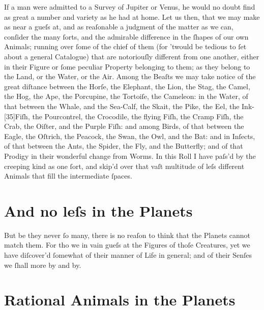 \documentclass[letterpaper]{book}
\begin{document}
If a man were admitted to a Survey of Jupiter or Venus, he would no doubt
find as great a number and variety as he had at home. Let us then, that we
may make as near a gueſs at, and as reaſonable a judgment of the matter
as we can, conſider the many ſorts, and the admirable difference in the
ſhapes of our own Animals; running over ſome of the chief of them (for
'twould be tedious to ſet about a general Catalogue) that are notoriouſly
different from one another, either in their Figure or ſome peculiar Property
belonging to them; as they belong to the Land, or the Water, or the Air.
Among the Beaſts we may take notice of the great diſtance between the
Horſe, the Elephant, the Lion, the Stag, the Camel, the Hog, the Ape, the
Porcupine, the Tortoiſe, the Cameleon: in the Water, of that between the
Whale, and the Sea-Calf, the Skait, the Pike, the Eel, the Ink-[35]Fiſh, the
Pourcontrel, the Crocodile, the flying Fiſh, the Cramp Fiſh, the Crab, the
Oiſter, and the Purple Fiſh: and among Birds, of that between the Eagle,
the Oſtrich, the Peacock, the Swan, the Owl, and the Bat: and in Inſects,
of that between the Ants, the Spider, the Fly, and the Butterfly; and of that
Prodigy in their wonderful change from Worms. In this Roll I have paſs'd
by the creeping kind as one ſort, and skip'd over that vaſt multitude of leſs
different Animals that fill the intermediate ſpaces.


\section{And no leſs in the Planets}

But be they never ſo many, there is no reaſon to think that the Planets cannot
match them. For tho we in vain gueſs at the Figures of thoſe Creatures, yet we
have diſcover'd ſomewhat of their manner of Life in general; and of their
Senſes we ſhall more by and by.


\section{Rational Animals in the Planets}
\end{document}
